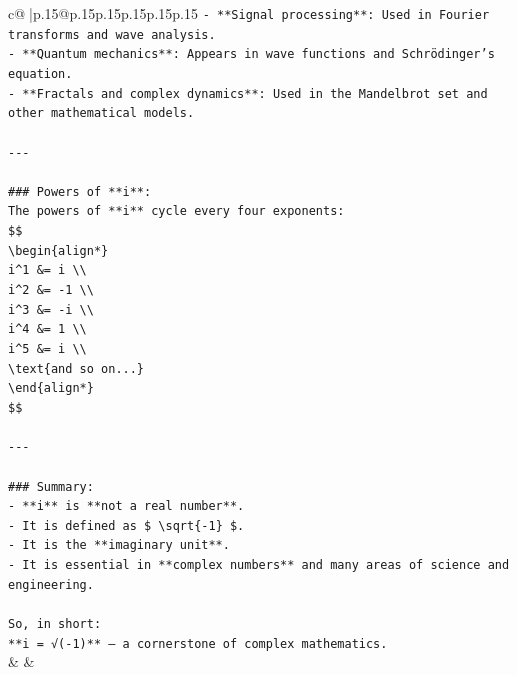 \documentclass{article}
\begin{document}
{\begin{supertabular}{c@{$\;$}|p{.15\linewidth}@{}p{.15\linewidth}p{.15\linewidth}p{.15\linewidth}p{.15\linewidth}p{.15\linewidth}}
{{{\texttt{{-} **Signal processing**: Used in Fourier transforms and wave analysis.} \\
\texttt{{-} **Quantum mechanics**: Appears in wave functions and Schrödinger's equation.} \\
\texttt{{-} **Fractals and complex dynamics**: Used in the Mandelbrot set and other mathematical models.} \\
\\ 
\texttt{{-}{-}{-}} \\
\\ 
\texttt{\#\#\# Powers of **i**:} \\
\texttt{The powers of **i** cycle every four exponents:} \\
\texttt{\$\$} \\
\texttt{\textbackslash{}begin\{align*\}} \\
\texttt{i\^{}1 \&= i \textbackslash{}\textbackslash{}} \\
\texttt{i\^{}2 \&= {-}1 \textbackslash{}\textbackslash{}} \\
\texttt{i\^{}3 \&= {-}i \textbackslash{}\textbackslash{}} \\
\texttt{i\^{}4 \&= 1 \textbackslash{}\textbackslash{}} \\
\texttt{i\^{}5 \&= i \textbackslash{}\textbackslash{}} \\
\texttt{\textbackslash{}text\{and so on...\}} \\
\texttt{\textbackslash{}end\{align*\}} \\
\texttt{\$\$} \\
\\ 
\texttt{{-}{-}{-}} \\
\\ 
\texttt{\#\#\# Summary:} \\
\texttt{{-} **i** is **not a real number**.} \\
\texttt{{-} It is defined as \$ \textbackslash{}sqrt\{{-}1\} \$.} \\
\texttt{{-} It is the **imaginary unit**.} \\
\texttt{{-} It is essential in **complex numbers** and many areas of science and engineering.} \\
\\ 
\texttt{So, in short:  } \\
\texttt{**i = √({-}1)** — a cornerstone of complex mathematics.} \\
            }
        }
    }
    & & \\ \\


\end{supertabular}}
\end{document}
